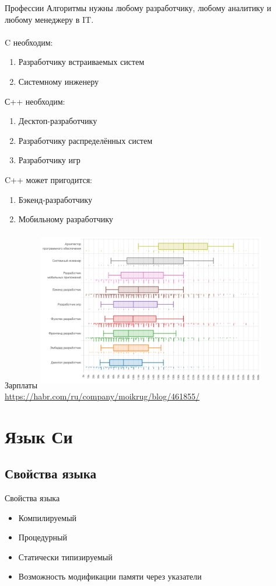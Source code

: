 \documentclass[10pt]{beamer}
\begin{document}
\begin{frame}{Профессии}
Алгоритмы нужны любому разработчику, любому аналитику и любому менеджеру в IT. \\
\\
C необходим:
\begin{enumerate}
    \item Разработчику встраиваемых систем
    \item Системному инженеру
\end{enumerate}

С++ необходим:
\begin{enumerate}
    \item Десктоп-разработчику
    \item Разработчику распределённых систем
    \item Разработчику игр
\end{enumerate}

C++ может пригодится:
\begin{enumerate}
    \item Бэкенд-разработчику
    \item Мобильному разработчику
\end{enumerate}
\end{frame}

\begin{frame}[fragile]{Зарплаты}
\includegraphics[width=10cm, height=7cm]{Term_1/Source/Pirctures/salaries.png}\\
\href{https://habr.com/ru/company/moikrug/blog/461855/}{https://habr.com/ru/company/moikrug/blog/461855/}
\end{frame}


\section{Язык Си}
\subsection{Свойства языка}
\begin{frame}[fragile]{Свойства языка}
\begin{itemize}
    \item Компилируемый
    \item Процедурный
    \item Статически типизируемый
    \item Возможность модификации памяти через указатели
\end{itemize}
\end{frame}
\end{document}

